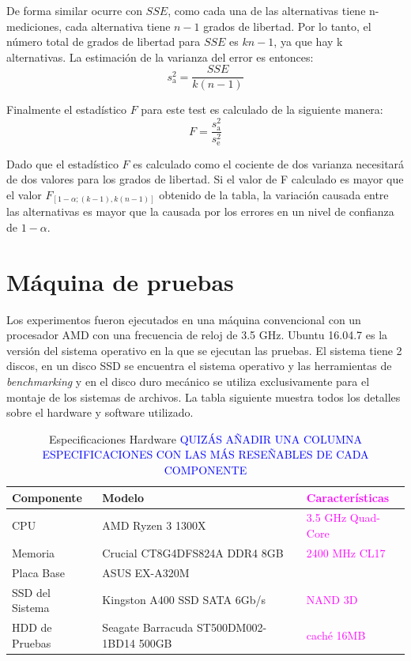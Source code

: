 De forma similar ocurre con $SSE$, como cada una de las alternativas tiene n-mediciones, cada alternativa tiene $n-1$ grados de libertad. Por lo tanto, el número total de grados de libertad para $SSE$ es $kn-1$, ya que hay k alternativas. La estimación de la varianza del error es entonces: 
$$
s_{\mathrm{a}}^{2}=\frac{S S E}{k(n-1)}
$$

Finalmente el estadístico $F$ para este test es calculado de la siguiente manera: $$
F=\frac{s_{\mathrm{a}}^{2}}{s_{\mathrm{e}}^{2}}
$$

Dado que el estadístico $F$ es calculado como el cociente de dos varianza necesitará de dos valores para los grados de libertad. Si el valor de F calculado es mayor que el valor $F_{[1-\alpha ;(k-1), k(n-1)]}$ obtenido de la tabla, la variación causada entre las alternativas es mayor que la causada por los errores en un nivel de confianza de $1-\alpha$.



\section{Máquina de pruebas}
Los experimentos fueron ejecutados en una máquina convencional con un procesador AMD con una frecuencia de reloj de 3.5 GHz. Ubuntu 16.04.7 es la versión del sistema operativo en la que se ejecutan las pruebas. El sistema tiene 2 discos, en un disco SSD se encuentra el sistema operativo y las herramientas de \textit{benchmarking} y en el disco duro mecánico se utiliza exclusivamente para el montaje de los sistemas de archivos. La tabla siguiente muestra todos los detalles sobre el hardware y software utilizado.
\begin{table}[h]
    \centering
    \begin{tabular}{|l|l|l|}
    \hline
        Componente & Modelo & \textcolor{magenta}{ Características}\\ \hline\hline
        CPU & AMD Ryzen 3 1300X & \textcolor{magenta}{ 3.5 GHz Quad-Core} \\ \hline
        Memoria & Crucial CT8G4DFS824A DDR4 8GB & \textcolor{magenta}{2400 MHz CL17}  \\ \hline
        Placa Base & ASUS EX-A320M & \\ \hline
        SSD del Sistema & Kingston A400 SSD SATA 6Gb/s& \textcolor{magenta}{ NAND 3D}  \\ \hline %
        HDD de Pruebas & Seagate Barracuda ST500DM002-1BD14 500GB & \textcolor{magenta}{caché 16MB}  \\ \hline %
    \end{tabular}
    \caption{Especificaciones Hardware \textcolor{blue}{QUIZÁS AÑADIR UNA COLUMNA ESPECIFICACIONES CON LAS MÁS RESEÑABLES DE CADA COMPONENTE}}
\label{table:1}
\end{table}

